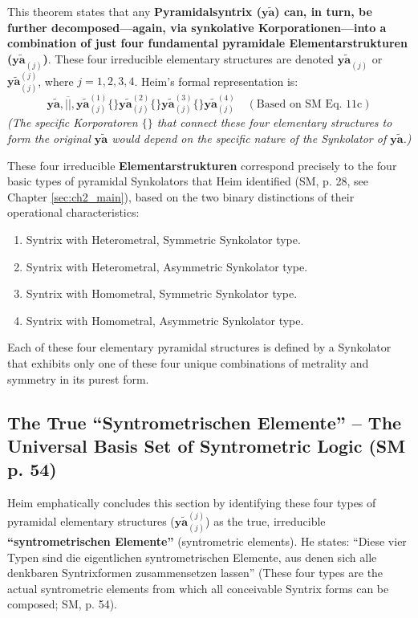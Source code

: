 \documentclass[
    12pt,              %
    a4paper,           %
    headings=normal,   %
    twoside=true,      %
    BCOR=8mm,          %
]{scrbook}
\newcommand{\q}[1]{\enquote{#1}}
\newcommand{\syntrix}{\bm{y\widetilde{a}}}
\newcommand{\elementarstruktur}{\bm{y\widetilde{a}}_{(j)}}
\begin{document}
This theorem states that any \textbf{Pyramidalsyntrix (\(\syntrix\)) can, in turn, be further decomposed—again, via synkolative Korporationen—into a combination of just four fundamental pyramidale Elementarstrukturen (\(\elementarstruktur\))}. These four irreducible elementary structures are denoted \(\syntrix_{(j)}\) or \(\elementarstruktur^{(j)}\), where \(j=1,2,3,4\). Heim's formal representation is:
\begin{equation} \label{eq:pyramidal_to_elementar_original_revised_2} %
    \syntrix, \overline{||}, \elementarstruktur^{(1)} \{ \} \elementarstruktur^{(2)} \{ \} \elementarstruktur^{(3)} \{ \} \elementarstruktur^{(4)} \quad (\text{Based on SM Eq. 11c})
\end{equation}
\textit{(The specific Korporatoren \(\{ \}\) that connect these four elementary structures to form the original \(\syntrix\) would depend on the specific nature of the Synkolator of \(\syntrix\).)}

These four irreducible \textbf{Elementarstrukturen} correspond precisely to the four basic types of pyramidal Synkolators that Heim identified (SM, p. 28, see Chapter \ref{sec:ch2_main}), based on the two binary distinctions of their operational characteristics:
\begin{enumerate}
    \item  Syntrix with Heterometral, Symmetric Synkolator type.
    \item  Syntrix with Heterometral, Asymmetric Synkolator type.
    \item  Syntrix with Homometral, Symmetric Synkolator type.
    \item  Syntrix with Homometral, Asymmetric Synkolator type.
\end{enumerate}
Each of these four elementary pyramidal structures is defined by a Synkolator that exhibits only one of these four unique combinations of metrality and symmetry in its purest form.

\subsection{The True \q{Syntrometrischen Elemente} – The Universal Basis Set of Syntrometric Logic (SM p. 54)}
\label{sec:ch3_true_syntrometric_elements_original} 

Heim emphatically concludes this section by identifying these four types of pyramidal elementary structures (\(\elementarstruktur^{(j)}\)) as the true, irreducible \textbf{\q{syntrometrischen Elemente}} (syntrometric elements). He states: \q{Diese vier Typen sind die eigentlichen syntrometrischen Elemente, aus denen sich alle denkbaren Syntrixformen zusammensetzen lassen} (These four types are the actual syntrometric elements from which all conceivable Syntrix forms can be composed; SM, p. 54).
\end{document}
